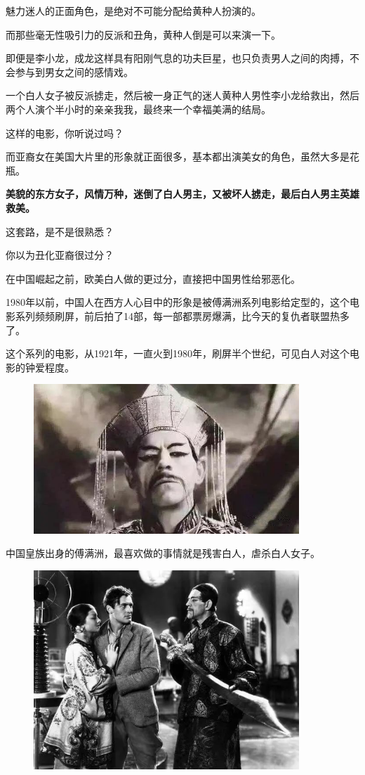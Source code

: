 \documentclass[UTF8, 11pt, oneside]{ctexart}
\newcommand{\zd}[1]{\textbf{\textcolor[RGB]{123,12,0}{#1}}} %
\begin{document}
魅力迷人的正面角色，是绝对不可能分配给黄种人扮演的。

而那些毫无性吸引力的反派和丑角，黄种人倒是可以来演一下。

即便是李小龙，成龙这样具有阳刚气息的功夫巨星，也只负责男人之间的肉搏，不会参与到男女之间的感情戏。

一个白人女子被反派掳走，然后被一身正气的迷人黄种人男性李小龙给救出，然后两个人演个半小时的亲亲我我，最终来一个幸福美满的结局。

这样的电影，你听说过吗？

而亚裔女在美国大片里的形象就正面很多，基本都出演美女的角色，虽然大多是花瓶。

\zd{美貌的东方女子，风情万种，迷倒了白人男主，又被坏人掳走，最后白人男主英雄救美。}

这套路，是不是很熟悉？

你以为丑化亚裔很过分？

在中国崛起之前，欧美白人做的更过分，直接把中国男性给邪恶化。

1980年以前，中国人在西方人心目中的形象是被傅满洲系列电影给定型的，这个电影系列频频刷屏，前后拍了14部，每一部都票房爆满，比今天的复仇者联盟热多了。

这个系列的电影，从1921年，一直火到1980年，刷屏半个世纪，可见白人对这个电影的钟爱程度。

\begin{figure}[H]
    \centering
    \includegraphics[width=10cm]{2023-09-06-004.jpg}
\end{figure}

中国皇族出身的傅满洲，最喜欢做的事情就是残害白人，虐杀白人女子。

\begin{figure}[H]
    \centering
    \includegraphics[width=10cm]{2023-09-06-005}
\end{figure}
\end{document}
